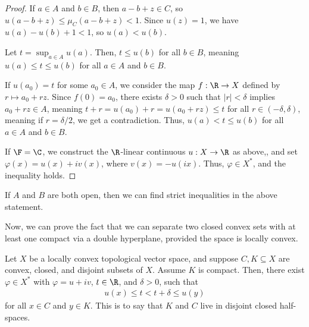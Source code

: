\documentclass[10pt]{mypackage}
\begin{document}
\begin{proof}
  If $a\in A$ and $b\in B$, then $a-b+z\in C$, so $u\left(a-b+z\right) \leq \mu_{C}\left(a-b+z\right) < 1$. Since $u(z) = 1$, we have $u\left(a\right) - u\left(b\right) + 1 < 1$, so $u(a) < u(b)$.\newline

  Let $t = \sup_{a\in A}u(a)$. Then, $t\leq u(b)$ for all $b\in B$, meaning $u(a) \leq t \leq u(b)$ for all $a\in A$ and $b\in B$.\newline

  If $u\left(a_0\right) = t$ for some $a_0\in A$, we consider the map $f: \R\rightarrow X$ defined by $r\mapsto a_0 + rz$. Since $f\left(0\right) = a_0$, there exists $\delta > 0$ such that $\left\vert r \right\vert < \delta$ implies $a_0 + rz \in A$, meaning $t + r = u\left(a_0\right) + r = u\left(a_0 + rz\right) \leq t$ for all $r\in \left(-\delta,\delta\right)$, meaning if $r = \delta/2$, we get a contradiction. Thus, $u(a) < t \leq u(b)$ for all $a\in A$ and $b\in B$.\newline

  If $\F = \C$, we construct the $\R$-linear continuous $u: X\rightarrow \R$ as above,, and set $\varphi\left(x\right) = u(x) + iv\left(x\right)$, where $v(x) = -u\left(ix\right)$. Thus, $\varphi\in X^{\ast}$, and the inequality holds.
\end{proof}
\begin{remark}
  If $A$ and $B$ are both open, then we can find strict inequalities in the above statement.
\end{remark}
Now, we can prove the fact that we can separate two closed convex sets with at least one compact via a double hyperplane, provided the space is locally convex.
\begin{theorem}
  Let $X$ be a locally convex topological vector space, and suppose $C,K\subseteq X$ are convex, closed, and disjoint subsets of $X$. Assume $K$ is compact. Then, there exist $\varphi\in X^{\ast}$ with $\varphi = u + iv$, $t\in \R$, and $\delta > 0$, such that
  \begin{align*}
    u\left(x\right) \leq t < t + \delta \leq u(y)
  \end{align*}
  for all $x\in C$ and $y\in K$. This is to say that $K$ and $C$ live in disjoint closed half-spaces.
\end{theorem}
\end{document}
